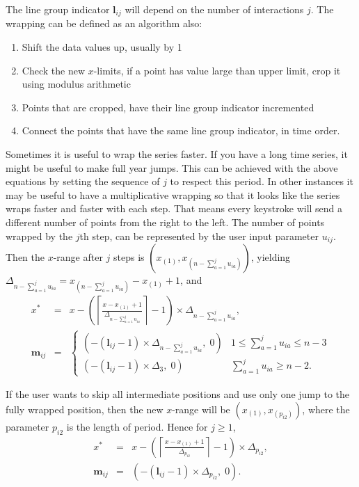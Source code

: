 \documentclass[12pt]{article}
\begin{document}
The line group indicator $\mathbf{l}{}_{ij}$ will depend on the number of interactions $j$. The wrapping can be defined as an algorithm also:

\begin{enumerate} \itemsep 0in
\item Shift the data values up, usually by 1
\item Check the new $x$-limits, if a point has value large than upper limit, crop it using modulus arithmetic
\item Points that are cropped, have their line group indicator incremented
\item Connect the points that have the same line group indicator, in time order.
\end{enumerate}

Sometimes it is useful to wrap the series faster. If you have
a long time series, it might be useful to make full year jumps.
This can be achieved with the above equations by setting the
sequence of $j$ to respect this period. In other instances it
may be useful to have a multiplicative wrapping so that it
looks like the series wraps faster and faster with each step.
That means every keystroke will send a different number of
points from the right to the left. The number of points
wrapped by the $j$th step, can be represented by the user
input parameter $u_{ij}$. Then the $x$-range after $j$ steps
is $(x_{(1)}, x_{(n-\sum_{a=1}^j u_{ia})})$, yielding
$\Delta_{n-\sum_{a=1}^j u_{ia}}=x_{(n-\sum_{a=1}^j u_{ia})}-x_{(1)}+1$, and
\begin{eqnarray*}
x^* & = & x-\left(\left\lceil \frac{x-x_{(1)}+1}{\Delta_{n-\sum_{a=1}^j u_{ia}}}\right\rceil -1\right)\times\Delta_{n-\sum_{a=1}^j u_{ia}}, \\
\mathbf{m}{}_{ij} & = & \begin{cases}
(-(\mathbf{l}{}_{ij} -1)\times\Delta_{n-\sum_{a=1}^j u_{ia}}, \; 0) & 1\leq \sum_{a=1}^j u_{ia} \leq n-3 \\
(-(\mathbf{l}{}_{ij} -1)\times\Delta_3, \; 0) & \sum_{a=1}^j u_{ia}\ge n-2.
\end{cases}
\end{eqnarray*}

If the user wants to skip all intermediate positions and use
only one jump to the fully wrapped position, %
then the new $x$-range will be $(x_{(1)}, x_{(p_{i2})})$, where
the parameter $p_{i2}$ is the length of period. Hence for $j\ge 1$,
\begin{eqnarray*}
x^* & = & x-\left(\left\lceil \frac{x-x_{(1)}+1}{\Delta_{p_{i2}}}\right\rceil -1\right)\times\Delta_{p_{i2}}, \\
\mathbf{m}{}_{ij} & = &
(-(\mathbf{l}{}_{ij} -1)\times\Delta_{p_{i2}}, \; 0).
\end{eqnarray*}
\end{document}
